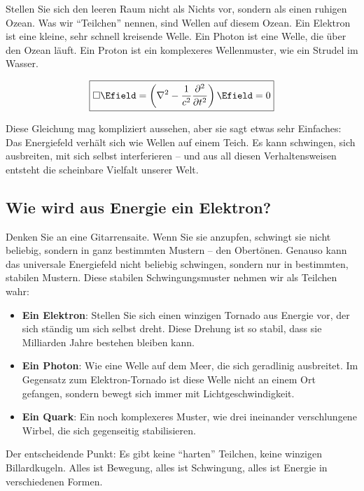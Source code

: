	Stellen Sie sich den leeren Raum nicht als Nichts vor, sondern als einen ruhigen Ozean. Was wir ``Teilchen'' nennen, sind Wellen auf diesem Ozean. Ein Elektron ist eine kleine, sehr schnell kreisende Welle. Ein Photon ist eine Welle, die über den Ozean läuft. Ein Proton ist ein komplexeres Wellenmuster, wie ein Strudel im Wasser.
	
	\begin{equation}
		\boxed{\square \Efield = \left(\nabla^2 - \frac{1}{c^2}\frac{\partial^2}{\partial t^2}\right) \Efield = 0}
	\end{equation}
	
	Diese Gleichung mag kompliziert aussehen, aber sie sagt etwas sehr Einfaches: Das Energiefeld verhält sich wie Wellen auf einem Teich. Es kann schwingen, sich ausbreiten, mit sich selbst interferieren -- und aus all diesen Verhaltensweisen entsteht die scheinbare Vielfalt unserer Welt.
	
	\subsection{Wie wird aus Energie ein Elektron?}
	
	Denken Sie an eine Gitarrensaite. Wenn Sie sie anzupfen, schwingt sie nicht beliebig, sondern in ganz bestimmten Mustern -- den Obertönen. Genauso kann das universale Energiefeld nicht beliebig schwingen, sondern nur in bestimmten, stabilen Mustern. Diese stabilen Schwingungsmuster nehmen wir als Teilchen wahr:
	
	\begin{itemize}
		\item \textbf{Ein Elektron}: Stellen Sie sich einen winzigen Tornado aus Energie vor, der sich ständig um sich selbst dreht. Diese Drehung ist so stabil, dass sie Milliarden Jahre bestehen bleiben kann.
		
		\item \textbf{Ein Photon}: Wie eine Welle auf dem Meer, die sich geradlinig ausbreitet. Im Gegensatz zum Elektron-Tornado ist diese Welle nicht an einem Ort gefangen, sondern bewegt sich immer mit Lichtgeschwindigkeit.
		
		\item \textbf{Ein Quark}: Ein noch komplexeres Muster, wie drei ineinander verschlungene Wirbel, die sich gegenseitig stabilisieren.
	\end{itemize}
	
	Der entscheidende Punkt: Es gibt keine ``harten'' Teilchen, keine winzigen Billardkugeln. Alles ist Bewegung, alles ist Schwingung, alles ist Energie in verschiedenen Formen.
	

